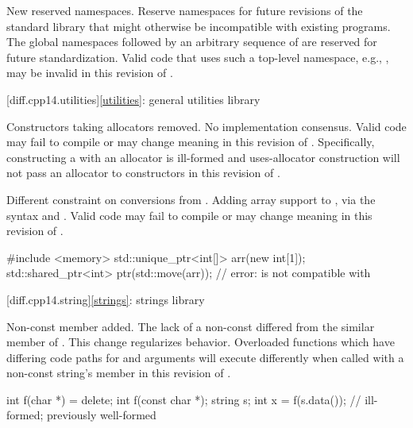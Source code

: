 \change
New reserved namespaces.
\rationale
Reserve namespaces for future revisions of the standard library
that might otherwise be incompatible with existing programs.
\effect
The global namespaces 
followed by an arbitrary sequence of 
are reserved for future standardization.
Valid \CppXIV{} code that uses such a top-level namespace,
e.g., , may be invalid in this revision of \Cpp{}.

[diff.cpp14.utilities]{\ref*{utilities}: general utilities library}

\change
Constructors taking allocators removed.
\rationale
No implementation consensus.
\effect
Valid \CppXIV{} code may fail to compile or may change meaning in this
revision of \Cpp{}. Specifically, constructing a  with
an allocator is ill-formed and uses-allocator construction will not pass an
allocator to  constructors in this revision of \Cpp{}.

\change
Different constraint on conversions from .
\rationale
Adding array support to ,
via the syntax  and .
\effect
Valid \CppXIV{} code may fail to compile or may change meaning in this
revision of \Cpp{}.
\begin{example}
\begin{codeblock}
#include <memory>
std::unique_ptr<int[]> arr(new int[1]);
std::shared_ptr<int> ptr(std::move(arr));   // error:  is not compatible with 
\end{codeblock}
\end{example}

[diff.cpp14.string]{\ref*{strings}: strings library}

\change
Non-const  member added.
\rationale
The lack of a non-const 
differed from the similar member of .
This change regularizes behavior.
\effect
Overloaded functions which have differing code paths
for  and  arguments
will execute differently
when called with a non-const string's  member
in this revision of \Cpp{}.
\begin{example}
\begin{codeblock}
int f(char *) = delete;
int f(const char *);
string s;
int x = f(s.data());            // ill-formed; previously well-formed
\end{codeblock}
\end{example}

